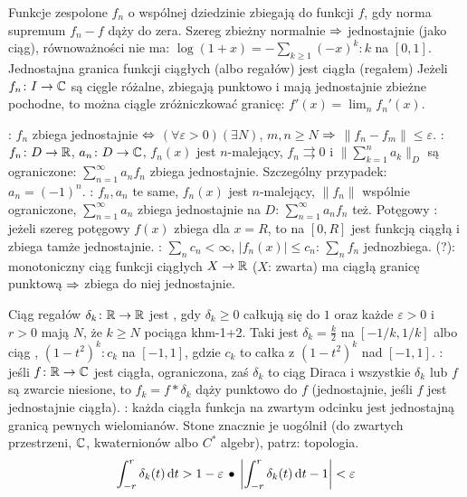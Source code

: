 Funkcje zespolone  $f_n$ o wspólnej dziedzinie zbiegają  do funkcji $f$, gdy norma supremum $f_n - f$ dąży do zera.
Szereg zbieżny normalnie $\Rightarrow$ jednostajnie (jako ciąg), równoważności nie ma: $\log(1+ x) = - \sum_{k \ge 1} (-x)^k : k$ na $[0,1]$.
Jednostajna granica funkcji ciągłych (albo regałów) jest ciągła (regałem)
Jeżeli $f_n \colon I \to \mathbb{C}$ są cięgle różalne, zbiegają punktowo i mają jednostajnie zbieżne pochodne, to można ciągle zróżniczkować granicę: $f'(x) = \lim_n f_n' (x)$.

:  $f_n$ zbiega  jednostajnie $\Leftrightarrow$ $(\forall \varepsilon > 0)(\exists N)$, $m, n \ge N$ $\Rightarrow$ $\|f_n - f_m\| \le \varepsilon$.
: $f_n \colon D \to \mathbb{R}$, $a_n \colon D \to \mathbb{C}$, $f_n(x)$ jest $n$-malejący, $f_n \rightrightarrows 0$ i $\|\sum_{k=1}^n a_k\|_D$ są ograniczone: $\sum_{n=1}^\infty a_nf_n$ zbiega jednostajnie.
Szczególny przypadek: $a_n = (-1)^n$.
: $f_n, a_n$ te same, $f_n(x)$ jest $n$-malejący, $\|f_n\|$ wspólnie ograniczone, $\sum_{n=1}^\infty a_n$ zbiega jednostajnie na $D$: $\sum_{n=1}^\infty a_nf_n$ też.
Potęgowy : jeżeli szereg potęgowy $f(x)$ zbiega dla $x = R$, to na $[0, R]$ jest funkcją ciągłą i zbiega tamże jednostajnie.
: $\sum_n c_n < \infty$, $|f_n(x)| \le c_n$: $\sum_n f_n$ jednozbiega.
 (?): monotoniczny ciąg funkcji ciągłych $X \to \mathbb{R}$ ($X$: zwarta) ma ciągłą granicę punktową $\Rightarrow$ zbiega do niej jednostajnie.

Ciąg  regałów $\delta_k \colon \mathbb{R} \to \mathbb{R}$ jest , gdy $\delta_k \ge 0$ całkują się do $1$ oraz każde $\varepsilon> 0$ i $r > 0$ mają $N$, że $k \ge N$ pociąga khm-1+2.
Taki jest $\delta_k = \frac k 2$ na $[-1/k, 1/k]$ albo ciąg , $(1-t^2)^k : c_k$ na $[-1, 1]$, gdzie $c_k$ to całka z $(1-t^2)^k$ nad $[-1, 1]$.
: jeśli $f \colon \mathbb{R} \to \mathbb{C}$ jest ciągła, ograniczona, zaś $\delta_k$ to ciąg Diraca i wszystkie $\delta_k$ lub $f$ są zwarcie niesione, to $f_k = f * \delta_k$ dąży punktowo do $f$ (jednostajnie, jeśli $f$ jest jednostajnie ciągła).
: każda ciągła funkcja na zwartym odcinku jest jednostajną granicą pewnych wielomianów.
Stone znacznie je uogólnił (do zwartych przestrzeni, $\mathbb{C}$, kwaternionów albo $C^*$ algebr), patrz: topologia.
\[
	\int_{-r}^{r} \delta_k(t) \,\textrm{d}t > 1 - \varepsilon \, \bullet \,
	\left|\int_{-r}^r \delta _k(t)\,\textrm{d}t - 1 \right| < \varepsilon
\]